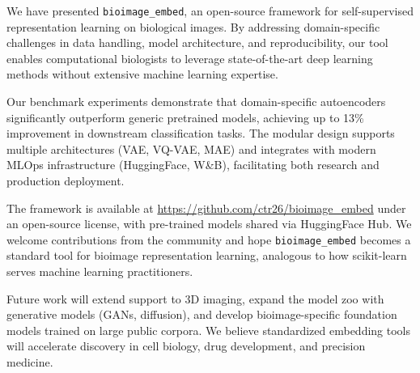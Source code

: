 We have presented \texttt{bioimage\_embed}, an open-source framework for self-supervised representation learning on biological images. By addressing domain-specific challenges in data handling, model architecture, and reproducibility, our tool enables computational biologists to leverage state-of-the-art deep learning methods without extensive machine learning expertise.

Our benchmark experiments demonstrate that domain-specific autoencoders significantly outperform generic pretrained models, achieving up to 13\% improvement in downstream classification tasks. The modular design supports multiple architectures (VAE, VQ-VAE, MAE) and integrates with modern MLOps infrastructure (HuggingFace, W\&B), facilitating both research and production deployment.

The framework is available at \url{https://github.com/ctr26/bioimage_embed} under an open-source license, with pre-trained models shared via HuggingFace Hub. We welcome contributions from the community and hope \texttt{bioimage\_embed} becomes a standard tool for bioimage representation learning, analogous to how scikit-learn serves machine learning practitioners.

Future work will extend support to 3D imaging, expand the model zoo with generative models (GANs, diffusion), and develop bioimage-specific foundation models trained on large public corpora. We believe standardized embedding tools will accelerate discovery in cell biology, drug development, and precision medicine.

